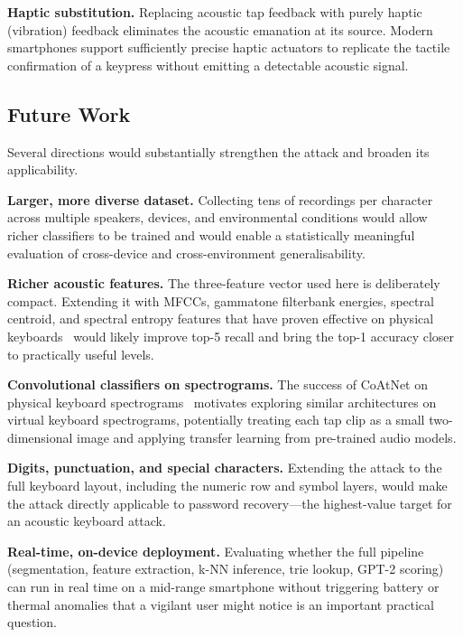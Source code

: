 \documentclass[conference]{IEEEtran}
\begin{document}
\textbf{Haptic substitution.}
Replacing acoustic tap feedback with purely haptic (vibration)
feedback eliminates the acoustic emanation at its source.
Modern smartphones support sufficiently precise haptic actuators
to replicate the tactile confirmation of a keypress without
emitting a detectable acoustic signal.

\subsection{Future Work}
\label{sec:future}

Several directions would substantially strengthen the attack and
broaden its applicability.

\textbf{Larger, more diverse dataset.}
Collecting tens of recordings per character across multiple
speakers, devices, and environmental conditions would allow
richer classifiers to be trained and would enable a statistically
meaningful evaluation of cross-device and cross-environment
generalisability.

\textbf{Richer acoustic features.}
The three-feature vector used here is deliberately compact.
Extending it with MFCCs, gammatone filterbank energies, spectral
centroid, and spectral entropy features that have proven
effective on physical keyboards~\cite{zhuang2005,harrison2023deep} 
would likely improve top-5 recall and bring the top-1 accuracy
closer to practically useful levels.

\textbf{Convolutional classifiers on spectrograms.}
The success of CoAtNet on physical keyboard spectrograms~\cite{harrison2023deep}
motivates exploring similar architectures on virtual keyboard
spectrograms, potentially treating each tap clip as a small
two-dimensional image and applying transfer learning from pre-trained
audio models.

\textbf{Digits, punctuation, and special characters.}
Extending the attack to the full keyboard layout, including
the numeric row and symbol layers, would make the attack directly
applicable to password recovery---the highest-value target for
an acoustic keyboard attack.

\textbf{Real-time, on-device deployment.}
Evaluating whether the full pipeline (segmentation, feature
extraction, k-NN inference, trie lookup, GPT-2 scoring) can run
in real time on a mid-range smartphone without triggering battery
or thermal anomalies that a vigilant user might notice is an
important practical question.
\end{document}
